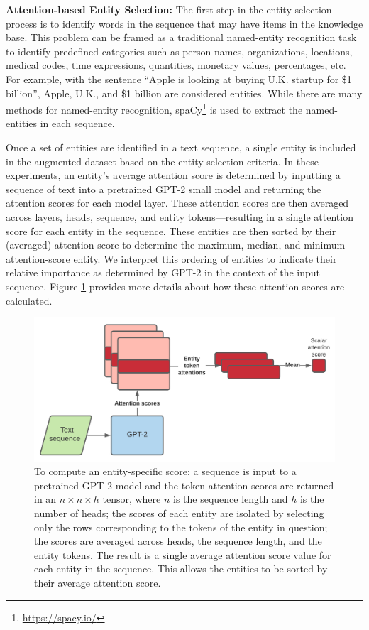 \documentclass[phd,electronic,oneside,twosidetoc,letterpaper,chaptercenter,parttop,lof]{byumsphd}
\begin{document}
\textbf{Attention-based Entity Selection:}
The first step in the entity selection process is to identify words in the sequence that may have items in the knowledge base. This problem can be framed as a traditional named-entity recognition task to identify predefined categories such as person names, organizations, locations, medical codes, time expressions, quantities, monetary values, percentages, etc.  For example, with the sentence ``Apple is looking at buying U.K. startup for \$1 billion'', Apple, U.K., and \$1 billion are considered entities. While there are many methods for named-entity recognition, spaCy\footnote{\url{https://spacy.io/}} is used to extract the named-entities in each sequence. 

Once a set of entities are identified in a text sequence, a single entity is included in the augmented dataset based on the entity selection criteria. 
In these experiments, an entity's average attention score is determined by inputting a sequence of text into a pretrained GPT-2 small model and returning the attention scores for each model layer.
These attention scores are then averaged across layers, heads, sequence, and entity tokens---resulting in a single attention score for each entity in the sequence.
These entities are then sorted by their (averaged) attention score to determine the maximum, median, and minimum attention-score entity.
We interpret this ordering of entities to indicate their relative importance as determined by GPT-2 in the context of the input sequence.
Figure \ref{fig:attention_scores} provides more details about how these attention scores are calculated.

\begin{figure}
    \includegraphics[width=0.75\columnwidth]{images/ssm/attention_score_calculation.png}
    \centering
    \caption[Attention score calculation]{
        To compute an entity-specific score: a sequence is input to a pretrained GPT-2 model and the token attention scores are returned in an 
        $n\times n\times h$
        tensor, where $n$ is the sequence length and $h$ is the number of heads;   
        the scores of each entity are isolated by selecting only the rows corresponding to the tokens of the entity in question; the scores are averaged across heads, the sequence length, and the entity tokens.
        The result is a single average attention score value for each entity in the sequence. 
        This allows the entities to be sorted by their average attention score.
    }
    \label{fig:attention_scores}
\end{figure}
\end{document}
